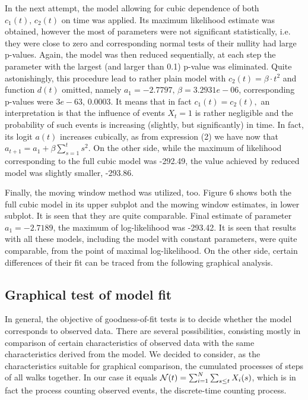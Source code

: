 \documentclass[11pt]{article}
\begin{document}
In the next attempt, the model allowing for cubic dependence of
both $c_1(t),\,c_2(t)$ on time was applied. Its maximum likelihood
estimate was obtained, however the most of parameters were not
significant statistically, i.e. they were close to zero and
corresponding normal tests of their nullity had large p-values.
Again, the model was then reduced sequentially, at each step the
parameter with the largest (and larger than 0.1) p-value was
eliminated. Quite astonishingly, this procedure lead to rather
plain model with $c_2(t)=\beta\cdot t^2$ and function $d(t)$
omitted, namely $a_1=-2.7797,\, \beta= 3.2931e-06$, corresponding
p-values were $3e-63,\,0.0003$. It means that in fact
$c_1(t)=c_2(t),$ an interpretation is that the influence of events
$X_t=1$ is rather negligible and the probability of such events is
increasing (slightly, but significantly) in time. In fact, its
logit $a(t)$ increases cubically, as from expression (2) we have
now that $a_{t+1}=a_1+\beta\sum_{s=1}^t s^2$. On the other side,
while the maximum of likelihood corresponding to the full cubic
model was -292.49, the value achieved by reduced model was
slightly smaller, -293.86.

Finally, the moving window method was utilized, too. Figure 6
shows both the full cubic model in its upper subplot and the
mowing window estimates, in lower subplot. It is seen that they
are quite comparable. Final estimate of parameter $ a_1 =
-2.7189$, the maximum of log-likelihood was -293.42.
 It is seen that results with all these models, including the model 
 with constant parameters, were quite comparable,
from the point of maximal log-likelihood. On the other side, 
certain differences of their fit can
be traced from the following graphical analysis.


\subsection{Graphical test of model fit}

In general, the objective of goodness-of-fit tests is to decide
whether the model corresponds to observed data. There are several
possibilities, consisting mostly in comparison of certain
characteristics of observed data with the same characteristics
derived from the model. We decided to consider, as the
characteristics suitable for graphical comparison, the cumulated
processes of steps of all walks together. In our case it equals
${\cal N}(t)=\sum_{i=1}^N \sum_{s\le t} X_i(s)$, which is in fact
the process counting observed events, the discrete-time counting
process.
\end{document}
